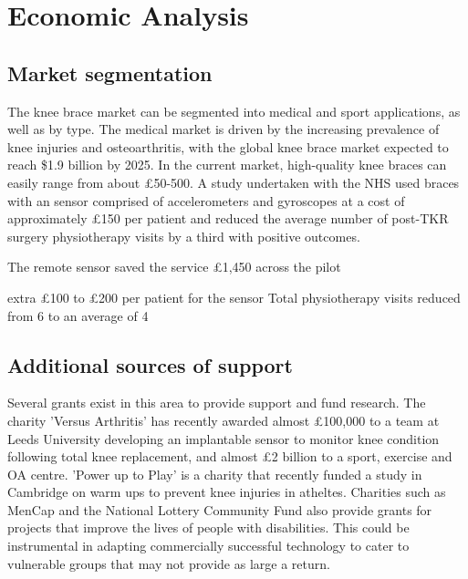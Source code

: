 \documentclass[main.tex]{subfiles}
\begin{document}
\section{Economic Analysis}

\subsection{Market segmentation}
The knee brace market can be segmented into medical and sport applications, as well as by type.
The medical market is driven by the increasing prevalence of knee injuries and osteoarthritis, with the global knee brace market expected to reach \$1.9 billion by 2025.
In the current market, high-quality knee braces can easily range from about £50-500.
A study undertaken with the NHS used braces with an sensor comprised of accelerometers and gyroscopes at a cost of approximately £150 per patient and reduced the average number of post-TKR surgery physiotherapy visits by a third with positive outcomes.



The remote sensor saved the service £1,450 across the pilot

extra £100 to £200 per patient for the sensor
Total physiotherapy visits reduced from 6 to an average of 4

\subsection{Additional sources of support}
Several grants exist in this area to provide support and fund research.
The charity 'Versus Arthritis' has recently awarded almost £100,000 to a team at Leeds University developing an implantable sensor to monitor knee condition following total knee replacement, and almost £2 billion to a sport, exercise and OA centre.
'Power up to Play' is a charity that recently funded a study in Cambridge on warm ups to prevent knee injuries in atheltes.
Charities such as MenCap and the National Lottery Community Fund also provide grants for projects that improve the lives of people with disabilities.
This could be instrumental in adapting commercially successful technology to cater to vulnerable groups that may not provide as large a return.



\ifSubfilesClassLoaded{%
	\printbibliography{}
}{}
\end{document}
